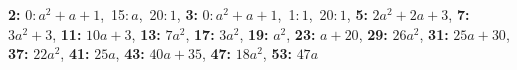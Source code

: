 \textsf{\bfseries 2:} 0:\,$a^2 + a + 1$,\ 15:\,$a$,\ 20:\,$1$, \textsf{\bfseries 3:} 0:\,$a^2 + a + 1$,\ 1:\,$1$,\ 20:\,$1$, \textsf{\bfseries 5:} $2a^2 + 2a + 3$, \textsf{\bfseries 7:} $3a^2 + 3$, \textsf{\bfseries 11:} $10a + 3$, \textsf{\bfseries 13:} $7a^2$, \textsf{\bfseries 17:} $3a^2$, \textsf{\bfseries 19:} $a^2$, \textsf{\bfseries 23:} $a + 20$, \textsf{\bfseries 29:} $26a^2$, \textsf{\bfseries 31:} $25a + 30$, \textsf{\bfseries 37:} $22a^2$, \textsf{\bfseries 41:} $25a$, \textsf{\bfseries 43:} $40a + 35$, \textsf{\bfseries 47:} $18a^2$, \textsf{\bfseries 53:} $47a$